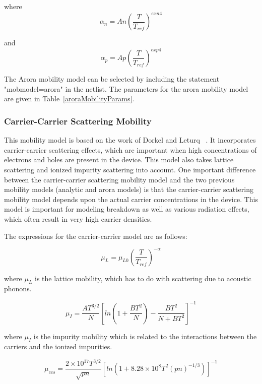 where 
\begin{equation}
   \alpha_{n} = An(\frac{T}{T_{ref}})^{exn4}
\end{equation}

and 
\begin{equation}
   \alpha_{p} = Ap(\frac{T}{T_{ref}})^{exp4}
\end{equation}   

The Arora mobility model can be selected by including the statement
"mobmodel=arora" in the netlist.  The parameters for the arora mobility
model are given in Table~\ref{aroraMobilityParams}.


\subsubsection{Carrier-Carrier Scattering Mobility}

This mobility model is based on the work of Dorkel and Leturq ~\cite{dorkel}.  
It incorporates carrier-carrier scattering effects, which are important when
high concentrations of electrons and holes are present in the device.  This
model also takes lattice scattering and ionized impurity scattering into
account.  One important difference between the carrier-carrier scattering
mobility model and the two previous mobility models (analytic and arora
models) is that the carrier-carrier scattering mobility model depends upon
the actual carrier concentrations in the device.  This model is important
for modeling breakdown as well as various radiation effects, which often
result in very high carrier densities.

The expressions for the carrier-carrier model are as follows:

\begin{equation}
   \mu_{L} = \mu_{L0}(\frac{T}{T_{ref}})^{-\alpha}
\end{equation}

where $\mu_{L}$ is the lattice mobility, which has to do with scattering
due to acoustic phonons.  

\begin{equation}
   \mu_{I} =
   \frac{AT^{3/2}}{N}[ln(1+\frac{BT^{2}}{N})-\frac{BT^{2}}{N+BT^{2}}]^{-1}
\end{equation}

where $\mu_{I}$ is the impurity mobility which is related to the
interactions between the carriers and the ionized impurities.

\begin{equation}
  \mu_{ccs} = \frac{2 \times 10^{17}T^{3/2}}{\sqrt{pn}}[ln(1+8.28 \times 10^{8}T^{2}(pn)^{-1/3})]^{-1}
\end{equation}


